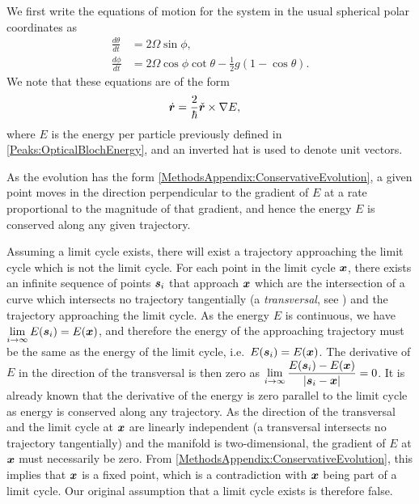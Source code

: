 We first write the equations of motion for the system in the usual spherical polar coordinates as
\begin{subequations}
    \label{MethodsAppendix:EvolutionOfAngles}
    \begin{align}
        \frac{d \theta}{dt} &= 2 \Omega \sin\phi, \label{MethodsAppendix:EvolutionOfAngles:Theta}\\
        \frac{d \phi}{dt} &= 2 \Omega \cos\phi \cot\theta - \frac{1}{2} g (1-\cos\theta). \label{MethodsAppendix:EvolutionOfAngles:Phi}
    \end{align}
\end{subequations}
We note that these equations are of the form
\begin{align}
    \dot{\vect{r}} &= \frac{2}{\hbar} \unitvec{r} \times \nabla E, \label{MethodsAppendix:ConservativeEvolution}
\end{align}
where $E$ is the energy per particle previously defined in \eqref{Peaks:OpticalBlochEnergy}, and an inverted hat is used to denote unit vectors.

As the evolution has the form \eqref{MethodsAppendix:ConservativeEvolution}, a given point moves in the direction perpendicular to the gradient of $E$ at a rate proportional to the magnitude of that gradient, and hence the energy $E$ is conserved along any given trajectory.

Assuming a limit cycle exists, there will exist a trajectory approaching the limit cycle which is not the limit cycle. For each point in the limit cycle $\bm{x}$, there exists an infinite sequence of points $\bm{s}_i$ that approach $\bm{x}$ which are the intersection of a curve which intersects no trajectory tangentially (a \emph{transversal}, see \citep{Schwartz:1963}) and the trajectory approaching the limit cycle.  As the energy $E$ is continuous, we have $\displaystyle \lim_{i\rightarrow\infty}E(\bm{s}_i) = E(\bm{x})$, and therefore the energy of the approaching trajectory must be the same as the energy of the limit cycle, i.e.\ $E(\bm{s}_i) = E(\bm{x})$.  The derivative of $E$ in the direction of the transversal is then zero as $\displaystyle \lim_{i\rightarrow\infty} \frac{E(\bm{s}_i) - E(\bm{x})}{\left|\bm{s}_i - \bm{x}\right|} = 0$.  It is already known that the derivative of the energy is zero parallel to the limit cycle as energy is conserved along any trajectory. As the direction of the transversal and the limit cycle at $\bm{x}$ are linearly independent (a transversal intersects no trajectory tangentially) and the manifold is two-dimensional, the gradient of $E$ at $\bm{x}$ must necessarily be zero.  From \eqref{MethodsAppendix:ConservativeEvolution}, this implies that $\bm{x}$ is a fixed point, which is a contradiction with $\bm{x}$ being part of a limit cycle.  Our original assumption that a limit cycle exists is therefore false.

